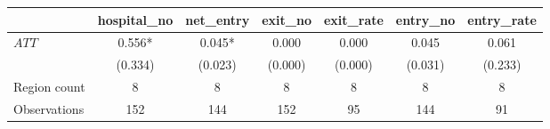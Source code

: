 
\begin{tabular}{lcccccc}
\toprule
 & hospital\_no & net\_entry & exit\_no & exit\_rate & entry\_no & entry\_rate\\
\midrule
$ATT$ & 0.556* & 0.045* & 0.000 & 0.000 & 0.045 & 0.061\\
 & (0.334) & (0.023) & (0.000) & (0.000) & (0.031) & (0.233)\\
\midrule
Region count & 8 & 8 & 8 & 8 & 8 & 8\\
Observations & 152 & 144 & 152 & 95 & 144 & 91\\
\bottomrule
\end{tabular}
